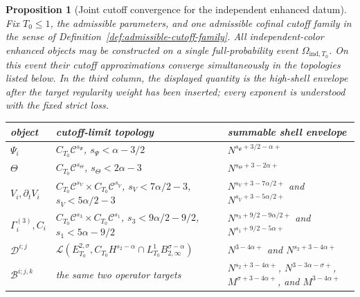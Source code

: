 \documentclass[10pt]{amsart}
\renewcommand{\arraystretch}{1.03}
\numberwithin{equation}{section}
\theoremstyle{plain}
\newtheorem{proposition}[theorem]{Proposition}
\theoremstyle{definition}
\theoremstyle{remark}
\begin{document}
\begin{proposition}[Joint cutoff convergence for the independent enhanced datum]\label{prop:common-independent-event}
Fix $T_0\le1$, the admissible parameters, and one admissible cofinal cutoff family in the sense of Definition~\ref{def:admissible-cutoff-family}.  All independent-color enhanced objects may be constructed on a single full-probability event $\Omega_{\mathrm{ind},T_0}$.  On this event their cutoff approximations converge simultaneously in the topologies listed below.  In the third column, the displayed quantity is the high-shell envelope after the target regularity weight has been inserted; every exponent is understood with the fixed strict loss.
\begin{center}
\scriptsize
\renewcommand{\arraystretch}{1.16}
\begin{tabular}{@{}>{\raggedright\arraybackslash}p{}>{\raggedright\arraybackslash}p{}>{\raggedright\arraybackslash}p{}@{}}
\toprule
object & cutoff-limit topology & summable shell envelope \\
\midrule
$\Psi_i$ & $C_{T_0}\mathcal C^{s_\Psi}$, $s_\Psi<\alpha-3/2$ & $N^{s_\Psi+3/2-\alpha+}$ \\
$\Theta$ & $C_{T_0}\mathcal C^{s_\Theta}$, $s_\Theta<2\alpha-3$ & $N^{s_\Theta+3-2\alpha+}$ \\
$V_i,\partial_tV_i$ & $C_{T_0}\mathcal C^{s_V}\times C_{T_0}\mathcal C^{s_{\dot V}}$, $s_V<7\alpha/2-3$, $s_{\dot V}<5\alpha/2-3$ & $N^{s_V+3-7\alpha/2+}$ and $N^{s_{\dot V}+3-5\alpha/2+}$ \\
$\Gamma_i^{(3)},C_i$ & $C_{T_0}\mathcal C^{s_3}\times C_{T_0}\mathcal C^{s_1}$, $s_3<9\alpha/2-9/2$, $s_1<5\alpha-9/2$ & $N^{s_3+9/2-9\alpha/2+}$ and $N^{s_1+9/2-5\alpha+}$ \\
$\mathcal D^{i;j}$ & $\mathcal L(E_{T_0}^{2,\sigma},C_{T_0}H^{s_2-\alpha}\cap L_{T_0}^1B_{2,\infty}^{\sigma-\alpha})$ & $N^{3-4\alpha+}$ and $N^{s_2+3-4\alpha+}$ \\
$\mathcal B^{i;j,k}$ & the same two operator targets & $N^{s_2+3-4\alpha+}$, $N^{3-3\alpha-\sigma+}$, $M^{\sigma+3-4\alpha+}$, and $M^{3-4\alpha+}$ \\
\bottomrule
\end{tabular}
\end{center}


\end{proposition}
\end{document}
